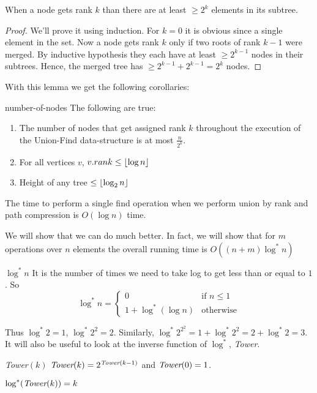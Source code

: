 \begin{lemma}{}{}
	When a node gets rank $k$ than there are at least $\geq 2^k$ elements in its subtree.
\end{lemma}
\begin{proof}
We'll prove it using induction. For $k=0$ it is obvious since a single element in the set. Now a node gets rank $k$ only if two roots of rank $k-1$ were merged. By inductive hypothesis they each have at least $\geq 2^{k-1}$ nodes in their subtrees. Hence, the merged tree has $\geq 2^{k-1}+2^{k-1}=2^{k}$ nodes.
\end{proof}
With this lemma we get the following corollaries:
\begin{corolary}{}{number-of-nodes}
	The following are true:
	\begin{enumerate}
		\item The number of nodes that get assigned rank $k$ throughout the execution of the Union-Find data-structure is at most $\frac{n}{2^k}$.
		\item For all vertices $v$, $v.rank\leq \left\lfloor \log n\right\rfloor$ 
		\item Height of any tree $\leq \left\lfloor\log _2n\right\rfloor$
	\end{enumerate}
\end{corolary}
\begin{lemma}{}{}
	The time to perform a single find operation when we perform union by rank and path
	compression is $O(\log n)$ time.
\end{lemma}
We will show that we can do much better. In fact, we will show that for $m$ operations over $n$ elements the overall running time is $O((n+m)\log ^*n)$
\begin{Definition}{$\log^* n$}{}
It is the number of times we need to take log to get less than or equal to $1$. So $$\log^*n=\begin{cases}
	0 &\text{if $n\leq 1$}\\ 
	1+\log^*(\log n) & \text{otherwise}
	\end{cases}$$
\end{Definition}\parinf Thus $\log^*2=1$, $\log^*2^2=2$. Similarly,  $\log^*2^{2^{2}}=1+\log^*2^2=2+\log^*2=3$. It will also be useful to look at the inverse function of $\log^*$, \emph{Tower}.
\begin{Definition}{\emph{Tower}$(k)$}{}
$\emph{Tower}(k)=2^{\emph{Tower}(k-1)}$ and $\emph{Tower}(0)=1$.
\end{Definition}\parinn

\begin{observation}
	$\log^*(\emph{Tower}(k))=k$
\end{observation}

